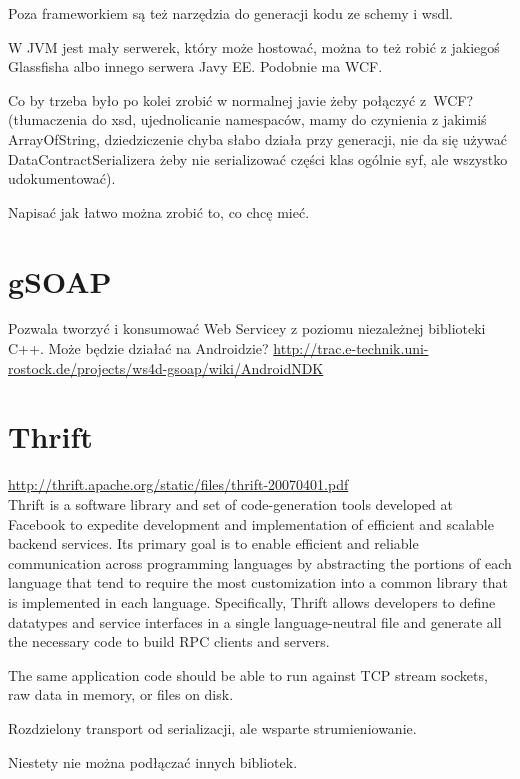 Poza frameworkiem są też narzędzia do generacji kodu ze schemy i wsdl.

W JVM jest mały serwerek, który może hostować, można to też robić z jakiegoś Glassfisha albo innego serwera Javy EE\@. Podobnie ma WCF.

Co by trzeba było po kolei zrobić w normalnej javie żeby połączyć z~WCF? (tłumaczenia do xsd, ujednolicanie namespaców, mamy do czynienia z jakimiś ArrayOfString, dziedziczenie chyba słabo działa przy generacji, nie da się używać DataContractSerializera żeby nie serializować części klas ogólnie syf, ale wszystko udokumentować). 

Napisać jak łatwo można zrobić to, co chcę mieć.



\section{gSOAP}
Pozwala tworzyć i konsumować Web Servicey z poziomu niezależnej biblioteki C++. Może będzie działać na Androidzie?
\url{http://trac.e-technik.uni-rostock.de/projects/ws4d-gsoap/wiki/AndroidNDK}\\



\section{Thrift}
\url{http://thrift.apache.org/static/files/thrift-20070401.pdf}\\

Thrift is a software library and set of code-generation tools developed
at Facebook to expedite development and implementation of
efficient and scalable backend services. Its primary goal is to enable
efficient and reliable communication across programming languages
by abstracting the portions of each language that tend to
require the most customization into a common library that is implemented
in each language. Specifically, Thrift allows developers to
define datatypes and service interfaces in a single language-neutral
file and generate all the necessary code to build RPC clients and
servers.

The same application code should be able to run against TCP stream sockets, raw data in memory, or files on disk.

Rozdzielony transport od serializacji, ale wsparte strumieniowanie.

Niestety nie można podłączać innych bibliotek.

